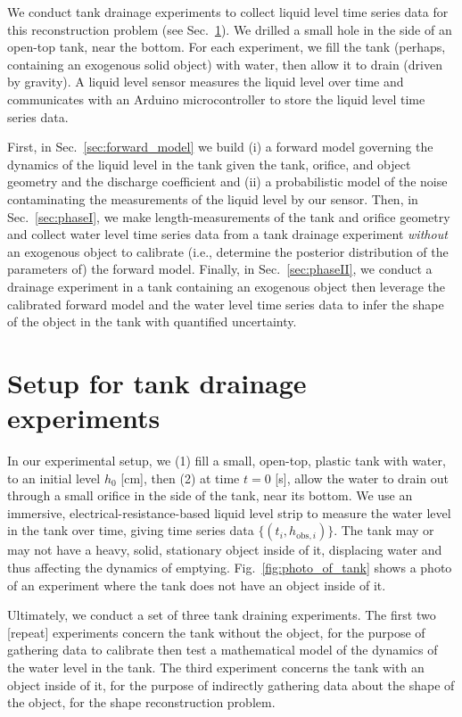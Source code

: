\documentclass[openacc]{rsproca_new}%
\begin{document}
We conduct tank drainage experiments to collect liquid level time series data for this reconstruction problem (see Sec.~\ref{sec:expt}).
We drilled a small hole in the side of an open-top tank, near the bottom.
For each experiment, we fill the tank (perhaps, containing an exogenous solid object) with water, then allow it to drain (driven by gravity). A liquid level sensor measures the liquid level over time and communicates with an Arduino microcontroller to store the liquid level time series data. 

First, in Sec.~\ref{sec:forward_model} we build (i) a forward model governing the dynamics of the liquid level in the tank given the tank, orifice, and object geometry and the discharge coefficient and (ii) a probabilistic model of the noise contaminating the measurements of the liquid level by our sensor.
Then, in Sec.~\ref{sec:phaseI}, we make length-measurements of the tank and orifice geometry and collect water level time series data from a tank drainage experiment \emph{without} an exogenous object to calibrate (i.e., determine the posterior distribution of the parameters of) the forward model. 
Finally, in Sec.~\ref{sec:phaseII}, we conduct a drainage experiment in a tank containing an exogenous object then leverage the calibrated forward model and the water level time series data to infer the shape of the object in the tank with quantified uncertainty.



\section{Setup for tank drainage experiments} \label{sec:expt}
In our experimental setup, we (1) fill a small, open-top, plastic tank with water, to an initial level $h_0$ [cm], then (2) at time $t=0$ [s], allow the water to drain out through a small orifice in the side of the tank, near its bottom. 
We use an immersive, electrical-resistance-based liquid level strip to measure the water level in the tank over time, giving time series data $\{(t_i, h_{\text{obs}, i}) \}$. The tank may or may not have a heavy, solid, stationary object inside of it, displacing water and thus affecting the dynamics of emptying. Fig.~\ref{fig:photo_of_tank} shows a photo of an experiment where the tank does not have an object inside of it.

Ultimately, we conduct a set of three tank draining experiments. The first two [repeat] experiments concern the tank without the object, for the purpose of gathering data to calibrate then test a mathematical model of the dynamics of the water level in the tank. The third experiment concerns the tank with an object inside of it, for the purpose of indirectly gathering data about the shape of the object, for the shape reconstruction problem.
\end{document}
